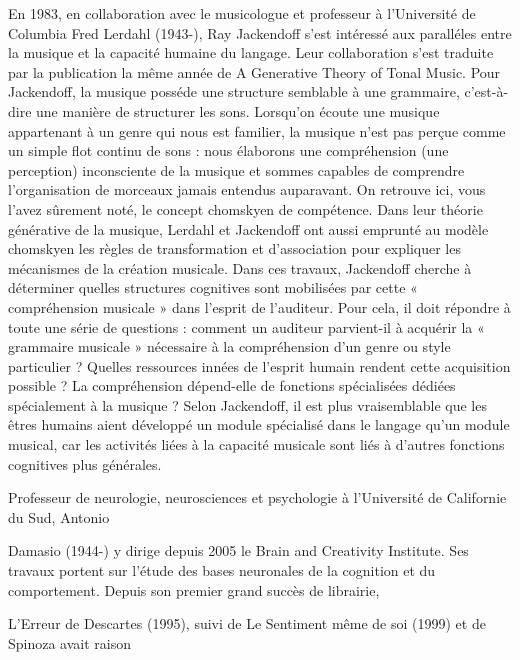 En 1983, en collaboration avec le musicologue et professeur à l’Université de Columbia Fred Lerdahl (1943-), Ray Jackendoff s’est intéressé aux paralléles entre la musique et la capacité humaine du langage. Leur collaboration s’est traduite par la publication la même année de A Generative Theory of Tonal Music. Pour Jackendoff, la musique posséde une structure semblable à une grammaire, c’est-à-dire une manière de structurer les sons. Lorsqu’on écoute une musique appartenant à un genre qui nous est familier, la musique n’est pas perçue comme un simple flot continu de sons : nous élaborons une compréhension (une perception) inconsciente de la musique et sommes capables de comprendre l’organisation de morceaux jamais entendus auparavant. On retrouve ici, vous l'avez sûrement noté, le concept chomskyen de compétence. Dans leur théorie générative de la musique, Lerdahl et Jackendoff ont aussi emprunté au modèle chomskyen les règles de transformation et d’association pour expliquer les mécanismes de la création musicale. Dans ces travaux, Jackendoff cherche à déterminer quelles structures cognitives sont mobilisées par cette « compréhension musicale » dans l'esprit de l'auditeur. Pour cela, il doit répondre à toute une série de questions : comment un auditeur parvient-il à acquérir la « grammaire musicale » nécessaire à la compréhension d’un genre ou style particulier ? Quelles ressources innées de l'esprit humain rendent cette acquisition possible ? La compréhension dépend-elle de fonctions spécialisées dédiées spécialement à la musique ? Selon Jackendoff, il est plus vraisemblable que les êtres humains aient développé un module spécialisé dans le langage qu’un module musical, car les activités liées à la capacité musicale sont liés à d’autres fonctions cognitives plus générales.\par


Professeur de neurologie, neurosciences et psychologie à l'Université de Californie du Sud, Antonio\par

Damasio (1944-) y dirige depuis 2005 le Brain and Creativity Institute. Ses travaux portent sur l'étude des bases neuronales de la cognition et du comportement. Depuis son premier grand succès de librairie,\par

L'Erreur de Descartes (1995), suivi de Le Sentiment même de soi (1999) et de Spinoza avait raison\par

